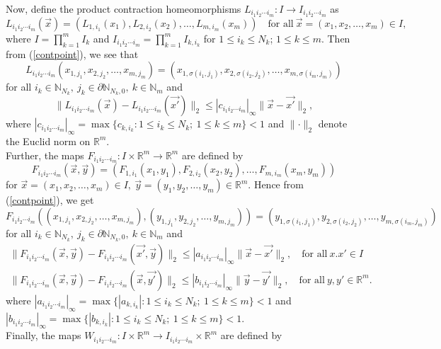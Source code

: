 \documentclass[10pt]{amsart}
\theoremstyle{definition}
\newcommand{\myproduct}[2]{#1=\prod_{k=1}^m#2}
\newcommand{\myseries}[3]{#1\leq #2\leq #3}
\newcommand{\myvec}[3]{#1=(#2_1,#2_2,\ldots,#2_#3)}
\newcommand{\prodifs}[1]{#1_{i_1i_2\cdots i_m}}
\newcommand{\prodpoint}[2]{#1_{1,#2_1},#1_{2,#2_2},\ldots,#1_{m,#2_m}}
\begin{document}
	Now, define  the product contraction homeomorphisms $\prodifs{L}:I\rightarrow\prodifs{I}$ as
	\begin{equation}
		\prodifs{L}(\vec{x})=(L_{1,i_1}(x_1),L_{2,i_2}(x_2),\ldots,L_{m,i_m}(x_m))\quad\mbox{for all}~ \myvec{\vec{x}}{x}{m}\in I, \label{procontrac}
	\end{equation}
	where $\myproduct{I}{I_k}$ and $\prodifs{I}=\prod_{k=1}^{m}I_{k,i_k}$ for $\myseries{1}{i_k}{N_k}$; $\myseries{1}{k}{m}$.
	Then from (\ref{contpoint}), we see that 
	\begin{equation}
		\prodifs{L}(\prodpoint{x}{j})=(x_{1,\sigma(i_1,j_1)},x_{2,\sigma(i_2,j_2)},\ldots,x_{m,\sigma(i_m,j_m)})
		\label{prodofL}
	\end{equation}
	for all $i_k\in \mathbb{N}_{N_k},~j_k\in \partial\mathbb{N}_{N_k,0},~ k\in\mathbb{N}_m$ and 
	\begin{equation}
		\lVert \prodifs{L}(\vec{x})-\prodifs{L}(\vec{x'})\rVert_2\leq |\prodifs{c}|_{\infty}\lVert \vec{x}-\vec{x'}\rVert_2,
		\label{ccoflt}
	\end{equation}
	where $|\prodifs{c}|_{\infty}=\max\{c_{k,i_k}:\myseries{1}{i_k}{N_k};~\myseries{1}{k}{m}\}<1$ and $\lVert\cdot\rVert_2$ denote the Euclid norm on $\mathbb{R}^m$.\\
	
	Further, the maps $\prodifs{F}:I\times\mathbb{R}^m\rightarrow\mathbb{R}^m$ are defined by 
	\begin{equation}
		\prodifs{F}(\vec{x},\vec{y})=(F_{1,i_1}(x_1,y_1),F_{2,i_2}(x_2,y_2),\ldots,F_{m,i_m}(x_m,y_m)) \label{prod of F}
	\end{equation}
	for $\myvec{\vec{x}}{x}{m}\in I,~\myvec{\vec{y}}{y}{m}\in\mathbb{R}^m.$ Hence from (\ref{contpoint}), we get 
	\begin{equation}
		\prodifs{F}((\prodpoint{x}{j}),(\prodpoint{y}{j}))=(y_{1,\sigma(i_1,j_1)},y_{2,\sigma(i_2,j_2)},\ldots,y_{m,\sigma(i_m,j_m)})
		\label{prodofF}
	\end{equation}
	for all $i_k\in \mathbb{N}_{N_k},~j_k\in \partial\mathbb{N}_{N_k,0},~ k\in\mathbb{N}_m$ and 
	\begin{equation}
		\left. \begin{array}{ll}
			\lVert \prodifs{F}(\vec{x},\vec{y})-\prodifs{F}(\vec{x'},\vec{y})\rVert_2\leq |\prodifs{a}|_{\infty}\lVert \vec{x}-\vec{x'}\rVert_2,\quad\mbox{for all}~ x.x'\in I\\
			\lVert \prodifs{F}(\vec{x},\vec{y})-\prodifs{F}(\vec{x},\vec{y'})\rVert_2\leq |\prodifs{b}|_{\infty}\lVert \vec{y}-\vec{y'}\rVert_2,\quad\mbox{for all}~ y,y'\in\mathbb{R}^m.
		\end{array} \right. 
		\label{cont.of F}
	\end{equation}
	where $|\prodifs{a}|_{\infty}=\max\{|a_{k,i_k}|:\myseries{1}{i_k}{N_k};~\myseries{1}{k}{m}\}<1$ and  $|\prodifs{b}|_{\infty}=\max\{|b_{k,i_k}|:\myseries{1}{i_k}{N_k};~\myseries{1}{k}{m}\}<1$.\\
	Finally, the maps $\prodifs{W}:I\times\mathbb{R}^m\rightarrow\prodifs{I}\times\mathbb{R}^m$ are defined by 
	
\end{document}
